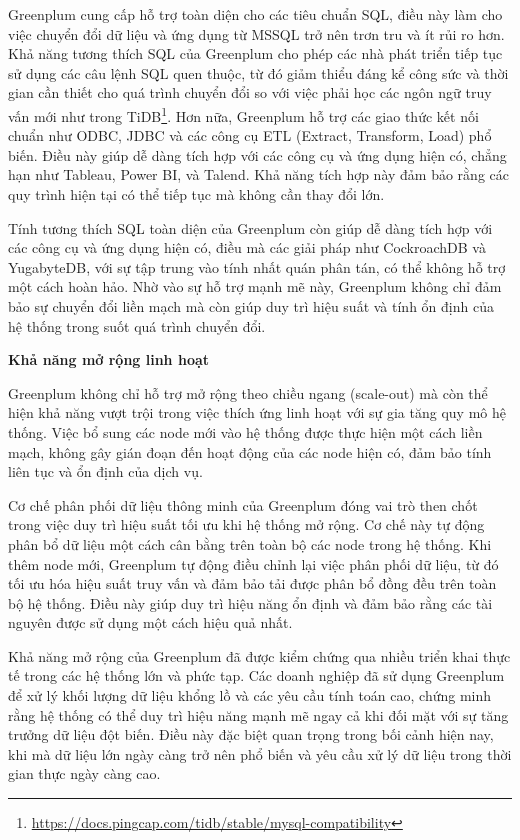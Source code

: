 \documentclass[14pt]{article}
\begin{document}
Greenplum cung cấp hỗ trợ toàn diện cho các tiêu chuẩn SQL, điều này làm cho việc chuyển đổi dữ liệu và ứng dụng từ MSSQL trở nên trơn tru và ít rủi ro hơn. Khả năng tương thích SQL của Greenplum cho phép các nhà phát triển tiếp tục sử dụng các câu lệnh SQL quen thuộc, từ đó giảm thiểu đáng kể công sức và thời gian cần thiết cho quá trình chuyển đổi so với việc phải học các ngôn ngữ truy vấn mới như trong TiDB\footnote{\url{https://docs.pingcap.com/tidb/stable/mysql-compatibility}}. Hơn nữa, Greenplum hỗ trợ các giao thức kết nối chuẩn như ODBC, JDBC và các công cụ ETL (Extract, Transform, Load) phổ biến. Điều này giúp dễ dàng tích hợp với các công cụ và ứng dụng hiện có, chẳng hạn như Tableau, Power BI, và Talend. Khả năng tích hợp này đảm bảo rằng các quy trình hiện tại có thể tiếp tục mà không cần thay đổi lớn.

Tính tương thích SQL toàn diện của Greenplum còn giúp dễ dàng tích hợp với các công cụ và ứng dụng hiện có, điều mà các giải pháp như CockroachDB và YugabyteDB, với sự tập trung vào tính nhất quán phân tán, có thể không hỗ trợ một cách hoàn hảo. Nhờ vào sự hỗ trợ mạnh mẽ này, Greenplum không chỉ đảm bảo sự chuyển đổi liền mạch mà còn giúp duy trì hiệu suất và tính ổn định của hệ thống trong suốt quá trình chuyển đổi.


\textbf{Khả năng mở rộng linh hoạt}

Greenplum không chỉ hỗ trợ mở rộng theo chiều ngang (scale-out) mà còn thể hiện khả năng vượt trội trong việc thích ứng linh hoạt với sự gia tăng quy mô hệ thống. Việc bổ sung các node mới vào hệ thống được thực hiện một cách liền mạch, không gây gián đoạn đến hoạt động của các node hiện có, đảm bảo tính liên tục và ổn định của dịch vụ.

Cơ chế phân phối dữ liệu thông minh của Greenplum đóng vai trò then chốt trong việc duy trì hiệu suất tối ưu khi hệ thống mở rộng. Cơ chế này tự động phân bổ dữ liệu một cách cân bằng trên toàn bộ các node trong hệ thống. Khi thêm node mới, Greenplum tự động điều chỉnh lại việc phân phối dữ liệu, từ đó tối ưu hóa hiệu suất truy vấn và đảm bảo tải được phân bổ đồng đều trên toàn bộ hệ thống. Điều này giúp duy trì hiệu năng ổn định và đảm bảo rằng các tài nguyên được sử dụng một cách hiệu quả nhất.

Khả năng mở rộng của Greenplum đã được kiểm chứng qua nhiều triển khai thực tế trong các hệ thống lớn và phức tạp. Các doanh nghiệp đã sử dụng Greenplum để xử lý khối lượng dữ liệu khổng lồ và các yêu cầu tính toán cao, chứng minh rằng hệ thống có thể duy trì hiệu năng mạnh mẽ ngay cả khi đối mặt với sự tăng trưởng dữ liệu đột biến. Điều này đặc biệt quan trọng trong bối cảnh hiện nay, khi mà dữ liệu lớn ngày càng trở nên phổ biến và yêu cầu xử lý dữ liệu trong thời gian thực ngày càng cao.
\end{document}
